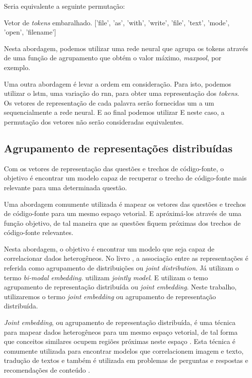 Seria equivalente a seguinte permutação:

\begin{mypythonembedding}{Vetor de \textit{tokens} embaralhado.}
['file', 'as', 'with', 'write', 'file', 'text', 'mode', 'open', 'filename']
\end{mypythonembedding}

Nesta abordagem, podemos utilizar uma rede neural que agrupa os tokens através de uma função de agrupamento que obtém o valor máximo, \textit{maxpool}, por exemplo.

Uma outra abordagem é levar a ordem em consideração. Para isto, podemos utilizar o \acrfull{lstm}, uma variação do \acrfull{rnn}, para obter uma representação dos \textit{tokens}. Os vetores de representação de cada palavra serão fornecidas um a um sequencialmente a rede neural. E ao final podemos utilizar E neste caso, a permutação dos vetores não serão consideradas equivalentes.

\subsection{Agrupamento de representações distribuídas}

Com os vetores de representação das questões e trechos de código-fonte, o objetivo é encontrar um modelo capaz de recuperar o trecho de código-fonte mais relevante para uma determinada questão. 

Uma abordagem comumente utilizada é mapear os vetores das questões e trechos de código-fonte para um mesmo espaço vetorial. E apróximá-los através de uma função objetivo, de tal maneira que as questões fiquem próximas dos trechos de código-fonte relevantes. 

Nesta abordagem, o objetivo é encontrar um modelo que seja capaz de correlacionar dados heterogêneos. No livro \cite{Goodfellow-et-al-2016:representation-learning}, a associação entre as representações é referida como agrupamento de distribuições ou \textit{joint distribution}. Já \cite{Sachdev-neural-code-search:2018, Allamanis-bimodal-source-code-natural-language:2015} utilizam o termo \textit{bi-modal embedding}. \cite{Zhang:2019:deep-learning-recommender-survey} utilizam \textit{jointly model}. E \cite{Gu-deep-code-search:2018} utilizam o temo agrupamento de representação distribuída ou \textit{joint embedding}. Neste trabalho, utilizaremos o termo \textit{joint embedding} ou agrupamento de representação distribuída.


\textit{Joint embedding}, ou agrupamento de representação distribuída, é uma técnica para mapear dados heterogêneos para um mesmo espaço vetorial, de tal forma que conceitos similares ocupem regiões próximas neste espaço \citep{Gu-deep-code-search:2018}. Esta técnica é comumente utilizada para encontrar modelos que correlacionem imagem e texto, tradução de textos e também é utilizada em problemas de perguntas e respostas e recomendações de conteúdo \citep{lai-etal-2018-review, Zhang:2019:deep-learning-recommender-survey}.

